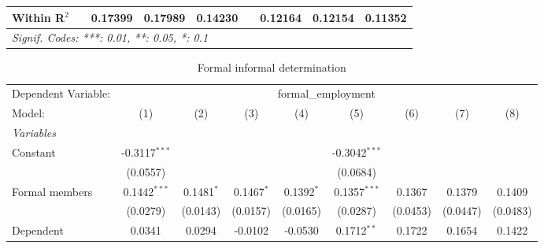 \begin{table}[htbp]
\begin{tabular}{lcccccccc}
      Within R$^2$              &                         & 0.17399                 & 0.17989                 & 0.14230                &                         & 0.12164                 & 0.12154                 & 0.11352\\  
      \midrule \midrule
      \multicolumn{9}{l}{\emph{Signif. Codes: ***: 0.01, **: 0.05, *: 0.1}}\\
   \end{tabular}
\end{table}



\begin{table}[htbp]
   \caption{Formal informal determination}
   \centering
   \begin{tabular}{lcccccccc}
      \tabularnewline \midrule \midrule
      Dependent Variable: & \multicolumn{8}{c}{formal\_employment}\\
      Model:                    & (1)                     & (2)                     & (3)                     & (4)                    & (5)                     & (6)                     & (7)                     & (8)\\  
      \midrule
      \emph{Variables}\\
      Constant                  & -0.3117$^{***}$         &                         &                         &                        & -0.3042$^{***}$         &                         &                         &   \\   
                                & (0.0557)                &                         &                         &                        & (0.0684)                &                         &                         &   \\   
      Formal members            & 0.1442$^{***}$          & 0.1481$^{*}$            & 0.1467$^{*}$            & 0.1392$^{*}$           & 0.1357$^{***}$          & 0.1367                  & 0.1379                  & 0.1409\\   
                                & (0.0279)                & (0.0143)                & (0.0157)                & (0.0165)               & (0.0287)                & (0.0453)                & (0.0447)                & (0.0483)\\   
      Dependent                 & 0.0341                  & 0.0294                  & -0.0102                 & -0.0530                & 0.1712$^{**}$           & 0.1722                  & 0.1654                  & 0.1422\\   

\end{tabular}
\end{table}
